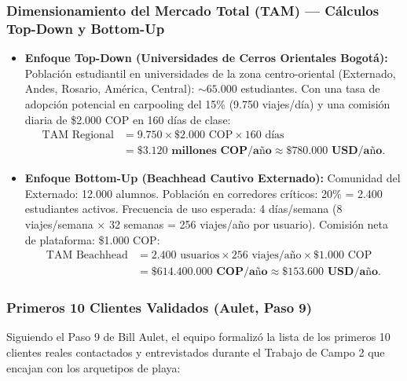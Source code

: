 \documentclass[11pt,a4paper]{article}
\begin{document}
\subsubsection{Dimensionamiento del Mercado Total (TAM) --- C\'alculos Top-Down y Bottom-Up}
\begin{itemize}[leftmargin=*]
    \item \textbf{Enfoque Top-Down (Universidades de Cerros Orientales Bogot\'a):}  
    Poblaci\'on estudiantil en universidades de la zona centro-oriental (Externado, Andes, Rosario, Am\'erica, Central): $\sim 65.000$ estudiantes. Con una tasa de adopci\'on potencial en carpooling del 15\% (9.750 viajes/d\'ia) y una comisi\'on diaria de \$2.000 COP en 160 d\'ias de clase:
    \begin{equation*}
    \begin{aligned}
    \text{TAM Regional} &= 9.750 \times \$2.000 \text{ COP} \times 160 \text{ d\'ias} \\
    &= \mathbf{\$3.120 \text{ millones COP/a\~no}} \approx \mathbf{\$780.000 \text{ USD/a\~no}}.
    \end{aligned}
    \end{equation*}

    \item \textbf{Enfoque Bottom-Up (Beachhead Cautivo Externado):}  
    Comunidad del Externado: 12.000 alumnos. Poblaci\'on en corredores cr\'iticos: 20\% = 2.400 estudiantes activos. Frecuencia de uso esperada: 4 d\'ias/semana (8 viajes/semana $\times$ 32 semanas = 256 viajes/a\~no por usuario). Comisi\'on neta de plataforma: \$1.000 COP:
    \begin{equation*}
    \begin{aligned}
    \text{TAM Beachhead} &= 2.400 \text{ usuarios} \times 256 \text{ viajes/a\~no} \times \$1.000 \text{ COP} \\
    &= \mathbf{\$614.400.000 \text{ COP/a\~no}} \approx \mathbf{\$153.600 \text{ USD/a\~no}}.
    \end{aligned}
    \end{equation*}
\end{itemize}

\clearpage
\subsubsection{Primeros 10 Clientes Validados (Aulet, Paso 9)}
Siguiendo el Paso 9 de Bill Aulet, el equipo formaliz\'o la lista de los primeros 10 clientes reales contactados y entrevistados durante el Trabajo de Campo 2 que encajan con los arquetipos de playa:
\end{document}
